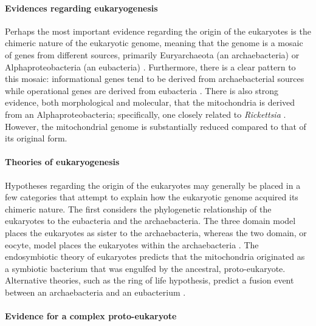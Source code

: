 \documentclass{article}
\begin{document}
    \paragraph*{Evidences regarding eukaryogenesis}
        Perhaps the most important evidence regarding the origin of the
            eukaryotes is the chimeric nature of the eukaryotic genome, meaning
            that the genome is a mosaic of genes from different sources,
            primarily Euryarchaeota (an archaebacteria) or Alphaproteobacteria
            (an eubacteria) \parencite{Kat12}.
        Furthermore, there is a clear pattern to this mosaic: informational
            genes tend to be derived from archaebacterial sources while
            operational genes are derived from eubacteria \parencite{Duv07}.
        There is also strong evidence, both morphological and molecular, that
            the mitochondria is derived from an Alphaproteobacteria;
            specifically, one closely related to \emph{Rickettsia}
            \parencite{Duv07,Kat12}.
        However, the mitochondrial genome is substantially reduced compared to
            that of its original form.

    \paragraph*{Theories of eukaryogenesis}
        Hypotheses regarding the origin of the eukaryotes may generally be
            placed in a few categories that attempt to explain how the
            eukaryotic genome acquired its chimeric nature.
        The first considers the phylogenetic relationship of the eukaryotes to
            the eubacteria and the archaebacteria.
        The three domain model places the eukaryotes as sister to the
            archaebacteria, whereas the two domain, or eocyte, model places the
            eukaryotes within the archaebacteria \parencite{Wil+13}.
        The endosymbiotic theory of eukaryotes predicts that the mitochondria
        originated as a symbiotic bacterium that was engulfed by the ancestral,
        proto-eukaryote.
        Alternative theories, such as the ring of life hypothesis, predict a
            fusion event between an archaebacteria and an eubacterium
            \parencite{RL04}.

    \paragraph*{Evidence for a complex proto-eukaryote}
\end{document}

